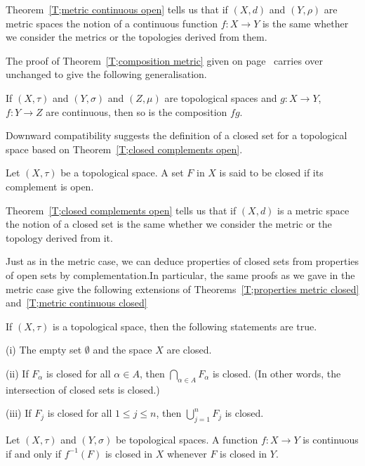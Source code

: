 Theorem~\ref{T;metric continuous open} tells us that
if $(X,d)$ and $(Y,\rho)$ are metric spaces the notion
of a continuous function $f:X\rightarrow Y$ is the same
whether we consider the metrics or the topologies derived from 
them.

The proof of Theorem~\ref{T;composition metric}
given on page~\pageref{New proof composition}
carries over unchanged to give the following generalisation.
\begin{theorem}
If $(X,\tau)$ and $(Y,\sigma)$
and $(Z,\mu)$ are topological spaces and 
$g:X\rightarrow Y$, $f:Y\rightarrow Z$
are continuous, then so is the composition $fg$.
\end{theorem}

Downward compatibility suggests the definition of a closed
set for a topological space based on 
Theorem~\ref{T;closed complements open}.
\begin{definition}\label{D;closed topologically}
Let $(X,\tau)$ be a topological space. A set $F$ in $X$
is said to be closed if its complement is open.
\end{definition}
Theorem~\ref{T;closed complements open} tells us that
if $(X,d)$ is a metric space the notion
of a closed set is the same
whether we consider the metric or the topology derived 
from it.

Just as in the metric case, we can
deduce properties of closed sets from properties of open sets 
by complementation.In particular, the same proofs as we
gave in the metric case give the following extensions of
Theorems~\ref{T;properties metric closed}
and~\ref{T;metric continuous closed}
\begin{theorem} 
If $(X,\tau)$ is a topological space, 
then the following statements are true.

(i) The empty set $\emptyset$ and the space $X$ are closed.

(ii) If $F_{\alpha}$ is closed for all $\alpha\in A$, then
$\bigcap_{\alpha\in A} F_{\alpha}$ is closed. (In other words,
the intersection of closed sets is closed.)

(iii) If $F_{j}$ is closed for all $1\leq j\leq n$, then
$\bigcup_{j=1}^{n} F_{j}$ is closed.
\end{theorem}
\begin{theorem}
Let $(X,\tau)$ and $(Y,\sigma)$
be topological spaces.
A function $f:X\rightarrow Y$ is continuous if and only
if $f^{-1}(F)$ is closed in $X$ whenever $F$ is closed in $Y$.
\end{theorem}
















